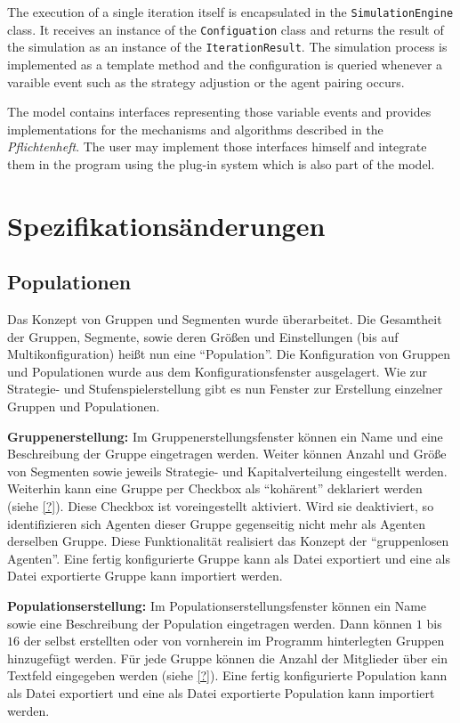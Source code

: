 \documentclass[parskip=full,11pt]{scrartcl}
\begin{document}
The execution of a single iteration itself is encapsulated in the \texttt{SimulationEngine} class. It receives an instance of the \texttt{Configuation} class and returns the result of the simulation as an instance of the \texttt{IterationResult}. The simulation process is implemented as a template method and the configuration is queried whenever a varaible event such as the strategy adjustion or the agent pairing occurs.

The model contains interfaces representing those variable events and provides implementations for the mechanisms and algorithms described in the \textit{Pflichtenheft}. The user may implement those interfaces himself and integrate them in the program using the plug-in system which is also part of the model.

\section{Spezifikationsänderungen}

\subsection{Populationen}
Das Konzept von Gruppen und Segmenten wurde überarbeitet. Die Gesamtheit der Gruppen, Segmente, sowie deren Größen und Einstellungen (bis auf Multikonfiguration) heißt nun eine \enquote{Population}. Die Konfiguration von Gruppen und Populationen wurde aus dem Konfigurationsfenster ausgelagert. Wie zur Strategie- und Stufenspielerstellung gibt es nun Fenster zur Erstellung einzelner Gruppen und Populationen.

\textbf{Gruppenerstellung:}
Im Gruppenerstellungsfenster können ein Name und eine Beschreibung der Gruppe eingetragen werden. Weiter können Anzahl und Größe von Segmenten sowie jeweils Strategie- und Kapitalverteilung eingestellt werden. Weiterhin kann eine Gruppe per Checkbox als \enquote{kohärent} deklariert werden (siehe \cref{?}). Diese Checkbox ist voreingestellt aktiviert. Wird sie deaktiviert, so identifizieren sich Agenten dieser Gruppe gegenseitig nicht mehr als Agenten derselben Gruppe. Diese Funktionalität realisiert das Konzept der \enquote{gruppenlosen Agenten}. Eine fertig konfigurierte Gruppe kann als Datei exportiert und eine als Datei exportierte Gruppe kann importiert werden.

\textbf{Populationserstellung:}
Im Populationserstellungsfenster können ein Name sowie eine Beschreibung der Population eingetragen werden. Dann können \(1\) bis \(16\) der selbst erstellten oder von vornherein im Programm hinterlegten Gruppen hinzugefügt werden. Für jede Gruppe können die Anzahl der Mitglieder über ein Textfeld eingegeben werden (siehe \cref{?}). Eine fertig konfigurierte Population kann als Datei exportiert und eine als Datei exportierte Population kann importiert werden.
\end{document}
